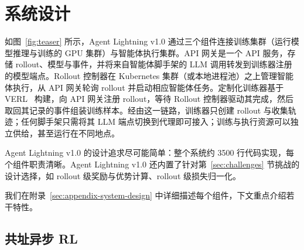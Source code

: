 \section{系统设计}
\label{sec:system-design}




如图~\ref{fig:teaser} 所示，Agent Lightning v1.0 通过三个组件连接训练集群（运行模型推理与训练的 GPU 集群）与智能体执行集群。API 网关是一个 API 服务，存储 rollout、模型与事件，并将来自智能体脚手架的 LLM 调用转发到训练器注册的模型端点。Rollout 控制器在 Kubernetes 集群（或本地进程池）之上管理智能体执行，从 API 网关轮询 rollout 并启动相应智能体任务。定制化训练器基于 VERL~\cite{hybridflow} 构建，向 API 网关注册 rollout，等待 Rollout 控制器驱动其完成，然后取回其记录的事件组装训练样本。经由这一链路，训练器只创建 rollout 与收集轨迹；任何脚手架只需将其 LLM 端点切换到代理即可接入；训练与执行资源可以独立供给，甚至运行在不同地点。

Agent Lightning v1.0 的设计追求尽可能简单：整个系统约 3500 行代码实现，每个组件职责清晰。Agent Lightning v1.0 还内置了针对第~\ref{sec:challenges} 节挑战的设计选择，如 rollout 级奖励与优势计算、rollout 级损失归一化。

我们在附录~\ref{sec:appendix-system-design} 中详细描述每个组件，下文重点介绍若干特性。

\subsection{共址异步 RL}


